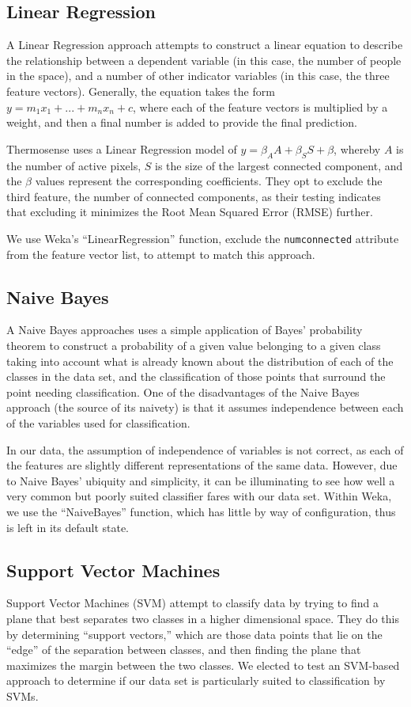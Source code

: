 \documentclass[../thesis/thesis.tex]{subfiles}
\begin{document}
\subsection{Linear Regression}
A Linear Regression approach attempts to construct a linear equation to describe the relationship between a dependent variable (in this case, the number of people in the space), and a number of other indicator variables (in this case, the three feature vectors). Generally, the equation takes the form $y = m_1x_1 + ... + m_nx_n + c$, where each of the feature vectors is multiplied by a weight, and then a final number is added to provide the final prediction.

Thermosense uses a Linear Regression model of $y = \beta_A A + \beta_S S + \beta $, whereby $A$ is the number of active pixels, $S$ is the size of the largest connected component, and the $\beta$ values represent the corresponding coefficients. They opt to exclude the third feature, the number of connected components, as their testing indicates that excluding it minimizes the Root Mean Squared Error (RMSE) further. 

We use Weka's ``LinearRegression'' function, exclude the \texttt{numconnected} attribute from the feature vector list, to attempt to match this approach.

\subsection{Naive Bayes}
A Naive Bayes approaches uses a simple application of Bayes' probability theorem to construct a probability of a given value belonging to a given class taking into account what is already known about the distribution of each of the classes in the data set, and the classification of those points that surround the point needing classification. One of the disadvantages of the Naive Bayes approach (the source of its naivety) is that it assumes independence between each of the variables used for classification.

In our data, the assumption of independence of variables is not correct, as each of the features are slightly different representations of the same data. However, due to Naive Bayes' ubiquity and simplicity, it can be illuminating to see how well a very common but poorly suited classifier fares with our data set. Within Weka, we use the ``NaiveBayes'' function, which has little by way of configuration, thus is left in its default state.

\subsection{Support Vector Machines}
Support Vector Machines (SVM) attempt to classify data by trying to find a plane that best separates two classes in a higher dimensional space. They do this by determining ``support vectors,'' which are those data points that lie on the ``edge'' of the separation between classes, and then finding the plane that maximizes the margin between the two classes. We elected to test an SVM-based approach to determine if our data set is particularly suited to classification by SVMs.
\end{document}
